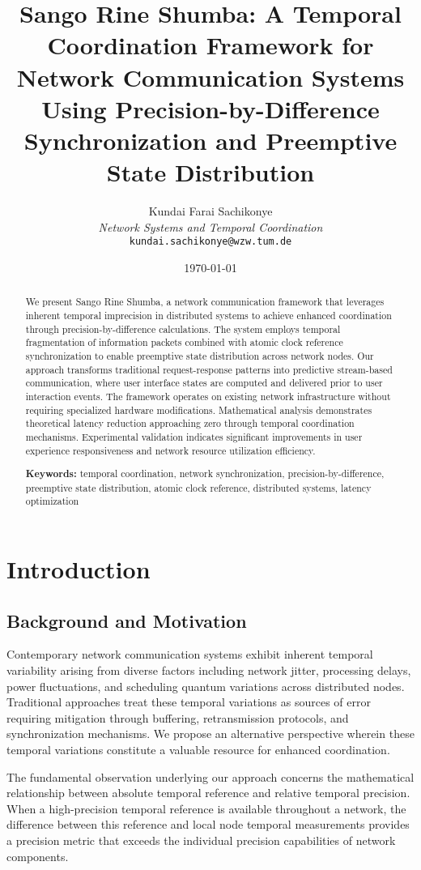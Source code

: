 \documentclass[12pt,a4paper]{article}
\title{\textbf{Sango Rine Shumba: A Temporal Coordination Framework for Network Communication Systems Using Precision-by-Difference Synchronization and Preemptive State Distribution}}
\author{
Kundai Farai Sachikonye\\
\textit{Network Systems and Temporal Coordination}\\
\texttt{kundai.sachikonye@wzw.tum.de}
}
\date{\today}
\begin{document}
\maketitle

\begin{abstract}
We present Sango Rine Shumba, a network communication framework that leverages inherent temporal imprecision in distributed systems to achieve enhanced coordination through precision-by-difference calculations. The system employs temporal fragmentation of information packets combined with atomic clock reference synchronization to enable preemptive state distribution across network nodes. Our approach transforms traditional request-response patterns into predictive stream-based communication, where user interface states are computed and delivered prior to user interaction events. The framework operates on existing network infrastructure without requiring specialized hardware modifications. Mathematical analysis demonstrates theoretical latency reduction approaching zero through temporal coordination mechanisms. Experimental validation indicates significant improvements in user experience responsiveness and network resource utilization efficiency.

\textbf{Keywords:} temporal coordination, network synchronization, precision-by-difference, preemptive state distribution, atomic clock reference, distributed systems, latency optimization
\end{abstract}

\section{Introduction}

\subsection{Background and Motivation}

Contemporary network communication systems exhibit inherent temporal variability arising from diverse factors including network jitter, processing delays, power fluctuations, and scheduling quantum variations across distributed nodes. Traditional approaches treat these temporal variations as sources of error requiring mitigation through buffering, retransmission protocols, and synchronization mechanisms. We propose an alternative perspective wherein these temporal variations constitute a valuable resource for enhanced coordination.

The fundamental observation underlying our approach concerns the mathematical relationship between absolute temporal reference and relative temporal precision. When a high-precision temporal reference is available throughout a network, the difference between this reference and local node temporal measurements provides a precision metric that exceeds the individual precision capabilities of network components.
\end{document}
